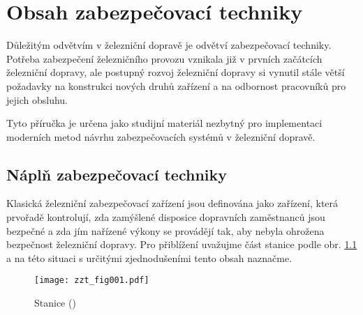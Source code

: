 \chapter{Obsah zabezpečovací techniky}\label{bzt:chapI}
\minitoc
  Důležitým odvětvím v železniční dopravě je odvětví zabezpečovací techniky. Potřeba zabezpečení 
  železničního provozu vznikala již v prvních začátcích železniční dopravy, ale postupný rozvoj 
  železniční dopravy si vynutil stále větší požadavky na konstrukci nových druhů zařízení a na 
  odbornost pracovníků pro jejich obsluhu.
  
  Tyto příručka je určena jako studijní materiál nezbytný pro implementaci moderních 
  metod návrhu zabezpečovacích systémů v železniční dopravě. 
   
\section{Náplň zabezpečovací techniky}
  Klasická železniční zabezpečovací zařízení jsou definována jako zařízení, která prvořadě 
  kontrolují, zda zamýšlené disposice dopravních zaměstnanců jsou bezpečné a zda jím nařízené 
  výkony se provádějí tak, aby nebyla ohrožena bezpečnost železniční dopravy. Pro přiblížení 
  uvažujme část stanice podle obr. \ref{zzt:fig001} a na této situaci s určitými zjednodušeními 
  tento obsah naznačme.

  \begin{figure}[ht!] %
    \centering
    \texttt{[image: zzt\_fig001.pdf]}
    \caption{Stanice
             (\cite[s.~5]{Chudacek2005})}
    \label{zzt:fig001}
  \end{figure}
 
